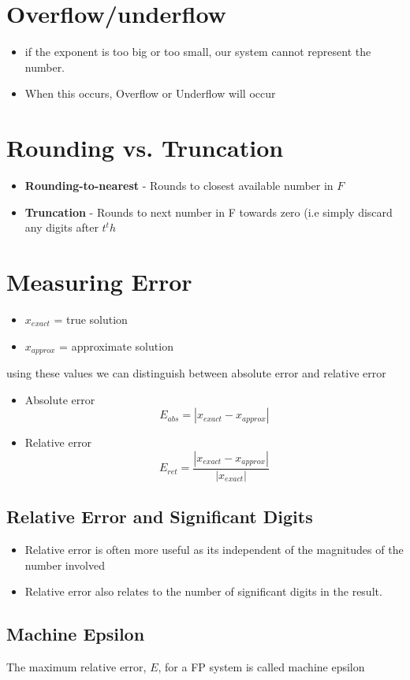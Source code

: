 \documentclass[twoside]{article}
\begin{document}
\section{Overflow/underflow}
\begin{itemize}
\item if the exponent is too big or too small, our system cannot represent the number.
\item When this occurs, Overflow or Underflow will occur 
\end{itemize}

\section{Rounding vs. Truncation}
\begin{itemize}
\item \textbf{Rounding-to-nearest} - Rounds to closest available number in \(F\)
\item \textbf{Truncation} - Rounds to next number in F towards zero (i.e simply discard any digits after \(t^th\)
\end{itemize}

\section{Measuring Error}
\begin{itemize}
\item \(x_{exact}\) = true solution
\item \(x_{approx}\) = approximate solution 
\end{itemize}

using these values we can distinguish between absolute error and relative error 
\begin{itemize}
\item Absolute error 
$$ E_{abs} = |x_{exact} - x_{approx}|$$
\item Relative error 
$$ E_{ret} = \frac{|x_{exact} - x_{approx}|}{|x_{exact}|}$$
\end{itemize} 

\subsection{Relative Error and Significant Digits}
\begin{itemize}
\item Relative error is often more useful as its independent of the magnitudes of the number involved
\item Relative error also relates to the number of significant digits in the result. 
\end{itemize}

\subsection{Machine Epsilon}
The maximum relative error, $E$, for a FP system is called machine epsilon
\end{document}
